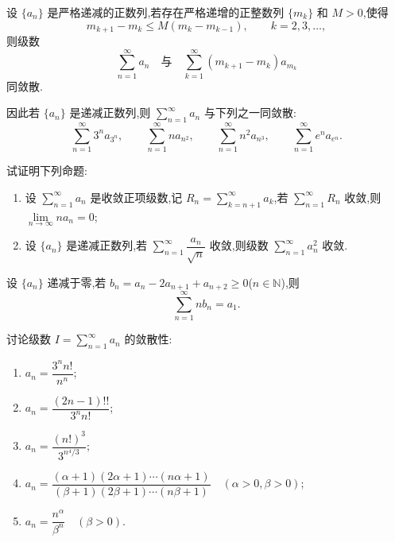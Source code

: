 \documentclass[../数学分析培优讲义.tex]{subfiles}
\begin{document}
\begin{example}
设 $\{a_n\}$ 是严格递减的正数列,若存在严格递增的正整数列 $\{m_k\}$ 和 $M>0$,使得
\[
    m_{k+1}-m_k\leq M(m_k-m_{k-1}),
    \qquad k=2,3,\ldots,
\]
则级数
\[
    \sum\limits_{n=1}^{\infty}a_n
    \quad\text{与}\quad
    \sum\limits_{k=1}^{\infty}(m_{k+1}-m_k)a_{m_k}
\]
同敛散.
\end{example}
\exampleblank

\begin{remark}
因此若 $\{a_n\}$ 是递减正数列,则 $\displaystyle\sum\limits_{n=1}^{\infty}a_n$ 与下列之一同敛散:
\[
    \sum\limits_{n=1}^{\infty}3^na_{3^n},
    \qquad
    \sum\limits_{n=1}^{\infty}na_{n^2},
    \qquad
    \sum\limits_{n=1}^{\infty}n^2a_{n^3},
    \qquad
    \sum\limits_{n=1}^{\infty}e^na_{e^n}.
\]
\end{remark}

\begin{example}
试证明下列命题:
\begin{enumerate}[label=(\arabic*)]
    \item 设 $\displaystyle\sum\limits_{n=1}^{\infty}a_n$ 是收敛正项级数,记 $\displaystyle R_n=\sum\limits_{k=n+1}^{\infty}a_k$,若 $\displaystyle\sum\limits_{n=1}^{\infty}R_n$ 收敛,则 $\displaystyle\lim\limits_{n\to\infty}na_n=0$;
    \item 设 $\{a_n\}$ 是递减正数列,若 $\displaystyle\sum\limits_{n=1}^{\infty}\dfrac{a_n}{\sqrt n}$ 收敛,则级数 $\displaystyle\sum\limits_{n=1}^{\infty}a_n^2$ 收敛.
\end{enumerate}
\end{example}
\exampleblank

\begin{example}
设 $\{a_n\}$ 递减于零,若 $b_n=a_n-2a_{n+1}+a_{n+2}\geq0$($n\in\mathbb{N}$),则
\[
    \sum\limits_{n=1}^{\infty}nb_n=a_1.
\]
\end{example}
\exampleblank


\newpage


\begin{example}
讨论级数 $\displaystyle I=\sum\limits_{n=1}^{\infty}a_n$ 的敛散性:
\begin{enumerate}[label=(\arabic*)]
    \item $\displaystyle a_n=\dfrac{3^n n!}{n^n}$;
    \item $\displaystyle a_n=\dfrac{(2n-1)!!}{3^n n!}$;
    \item $\displaystyle a_n=\dfrac{(n!)^3}{3^{n^4/3}}$;
    \item $\displaystyle a_n=\dfrac{(\alpha+1)(2\alpha+1)\cdots(n\alpha+1)}{(\beta+1)(2\beta+1)\cdots(n\beta+1)}\quad(\alpha>0,\beta>0)$;
    \item $\displaystyle a_n=\dfrac{n^\alpha}{\beta^n}\quad(\beta>0)$.
\end{enumerate}
\end{example}
\exampleblank
\end{document}
